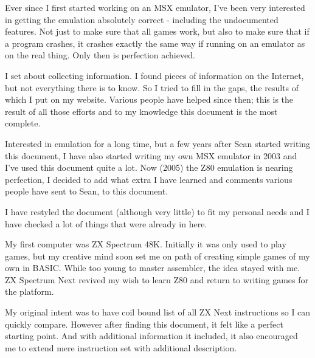 \documentclass[twoside,openright,a4paper]{book}
\begin{document}
\begin{description}[style=unboxed,leftmargin=0cm]

	\item[Sean]\hfill
	
	Ever since I first started working on an MSX emulator, I've been very interested in getting the emulation absolutely correct - including the undocumented features. Not just to make sure that all games work, but also to make sure that if a program crashes, it crashes exactly the same way if running on an emulator as on the real thing. Only then is perfection achieved.

	I set about collecting information. I found pieces of information on the Internet, but not everything there is to know. So I tried to fill in the gaps, the results of which I put on my website. Various people have helped since then; this is the result of all those efforts and to my knowledge this document is the most complete.

	\item[Jan]\hfill

	Interested in emulation for a long time, but a few years after Sean started writing this document, I have also started writing my own MSX emulator in 2003 and I've used this document quite a lot. Now (2005) the Z80 emulation is nearing perfection, I decided to add what extra I have learned and comments various people have sent to Sean, to this document.

	I have restyled the document (although very little) to fit my personal needs and I have checked a lot of things that were already in here.

	\item[Tomaz]\hfill
	
	My first computer was ZX Spectrum 48K. Initially it was only used to play games, but my creative mind soon set me on path of creating simple games of my own in BASIC. While too young to master assembler, the idea stayed with me. ZX Spectrum Next revived my wish to learn Z80 and return to writing games for the platform.
	
	My original intent was to have coil bound list of all ZX Next instructions so I can quickly compare. However after finding this document, it felt like a perfect starting point. And with additional information it included, it also encouraged me to extend mere instruction set with additional description.
 
\end{description}
\end{document}
